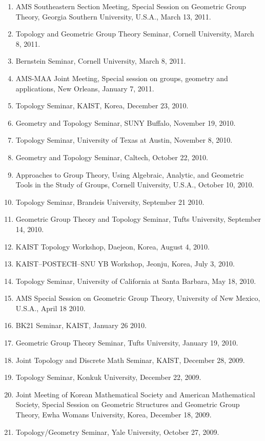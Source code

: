 \documentclass[11pt,a4paper]{article}
\begin{document}
\begin{enumerate}[leftmargin=1.5em, label=\arabic*.]
\item AMS Southeastern Section Meeting, Special Session on Geometric Group Theory, Georgia Southern University, U.S.A., March 13, 2011.
\item Topology and Geometric Group Theory Seminar, Cornell University, March 8, 2011.
\item Bernstein Seminar, Cornell University, March 8, 2011.
\item AMS-MAA Joint Meeting, Special session on groups, geometry and applications, New Orleans, January 7, 2011.
\item Topology Seminar, KAIST, Korea, December 23, 2010.
\item Geometry and Topology Seminar, SUNY Buffalo, November 19, 2010.
\item Topology Seminar, University of Texas at Austin, November 8, 2010.
\item Geometry and Topology Seminar, Caltech, October 22, 2010.
\item Approaches to Group Theory, Using Algebraic, Analytic, and Geometric Tools in the Study of Groups, Cornell University, U.S.A., October 10, 2010.
\item Topology Seminar, Brandeis University, September 21 2010.
\item Geometric Group Theory and Topology Seminar, Tufts University, September 14, 2010.
\item KAIST Topology Workshop, Daejeon, Korea, August 4, 2010.
\item KAIST--POSTECH--SNU YB Workshop, Jeonju, Korea, July 3, 2010.
\item Topology Seminar, University of California at Santa Barbara, May 18, 2010.
\item AMS Special Session on Geometric Group Theory, University of New Mexico, U.S.A., April 18 2010.
\item BK21 Seminar, KAIST, January 26 2010.
\item Geometric Group Theory Seminar, Tufts University, January 19, 2010.
\item Joint Topology and Discrete Math Seminar, KAIST, December 28, 2009.
\item Topology Seminar, Konkuk University, December 22, 2009.
\item Joint Meeting of Korean Mathematical Society and American Mathematical Society, Special Session on Geometric Structures and Geometric Group Theory, Ewha Womans University, Korea, December 18, 2009.
\item Topology/Geometry Seminar, Yale University, October 27, 2009.

\end{enumerate}
\end{document}
